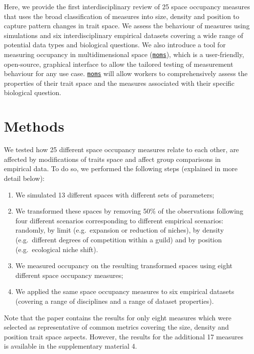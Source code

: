 \documentclass[]{article}
\providecommand{\tightlist}{%
  \setlength{\itemsep}{0pt}\setlength{\parskip}{0pt}}
\begin{document}
Here, we provide the first interdisciplinary review of 25 space
occupancy measures that uses the broad classification of measures into
size, density and position to capture pattern changes in trait space. We
assess the behaviour of measures using simulations and six
interdisciplinary empirical datasets covering a wide range of potential
data types and biological questions. We also introduce a tool for
measuring occupancy in multidimensional space
(\href{https://tguillerme.shinyapps.io/moms/}{\texttt{moms}}), which is
a user-friendly, open-source, graphical interface to allow the tailored
testing of measurement behaviour for any use case.
\href{https://tguillerme.shinyapps.io/moms/}{\texttt{moms}} will allow
workers to comprehensively assess the properties of their trait space
and the measures associated with their specific biological question.

\section{Methods}\label{methods}

We tested how 25 different space occupancy measures relate to each
other, are affected by modifications of traits space and affect group
comparisons in empirical data. To do so, we performed the following
steps (explained in more detail below):

\begin{enumerate}
\def\labelenumi{\arabic{enumi}.}
\tightlist
\item
  We simulated 13 different spaces with different sets of parameters;
\item
  We transformed these spaces by removing 50\% of the observations
  following four different scenarios corresponding to different
  empirical scenarios: randomly, by limit (e.g.~expansion or reduction
  of niches), by density (e.g.~different degrees of competition within a
  guild) and by position (e.g.~ecological niche shift).
\item
  We measured occupancy on the resulting transformed spaces using eight
  different space occupancy measures;
\item
  We applied the same space occupancy measures to six empirical datasets
  (covering a range of disciplines and a range of dataset properties).
\end{enumerate}

Note that the paper contains the results for only eight measures which
were selected as representative of common metrics covering the size,
density and position trait space aspects. However, the results for the
additional 17 measures is available in the supplementary material 4.
\end{document}
